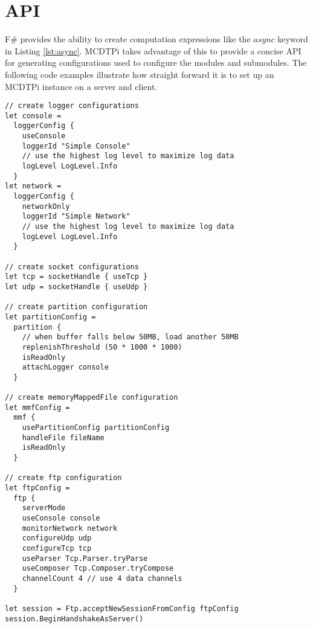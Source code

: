 \section{API}\label{sec:api}

F\# provides the ability to create computation expressions like the $async$ keyword in Listing \ref{lst:async}. MCDTPi takes advantage of this to provide a concise API for generating configurations used to configure the modules and submodules. The following code examples illustrate how straight forward it is to set up an MCDTPi instance on a server and client.

\begin{lstlisting}[caption=Server Example]
// create logger configurations
let console =
  loggerConfig {
    useConsole
    loggerId "Simple Console"
    // use the highest log level to maximize log data
    logLevel LogLevel.Info
  }
let network =
  loggerConfig {
    networkOnly
    loggerId "Simple Network"
    // use the highest log level to maximize log data
    logLevel LogLevel.Info
  }

// create socket configurations
let tcp = socketHandle { useTcp }
let udp = socketHandle { useUdp }

// create partition configuration
let partitionConfig =
  partition {
    // when buffer falls below 50MB, load another 50MB
    replenishThreshold (50 * 1000 * 1000)
    isReadOnly
    attachLogger console
  }

// create memoryMappedFile configuration
let mmfConfig =
  mmf {
    usePartitionConfig partitionConfig
    handleFile fileName
    isReadOnly
  }

// create ftp configuration
let ftpConfig =
  ftp {
    serverMode
    useConsole console
    monitorNetwork network
    configureUdp udp
    configureTcp tcp
    useParser Tcp.Parser.tryParse
    useComposer Tcp.Composer.tryCompose
    channelCount 4 // use 4 data channels
  }

let session = Ftp.acceptNewSessionFromConfig ftpConfig
session.BeginHandshakeAsServer()

\end{lstlisting}

\vskip 0.8in

